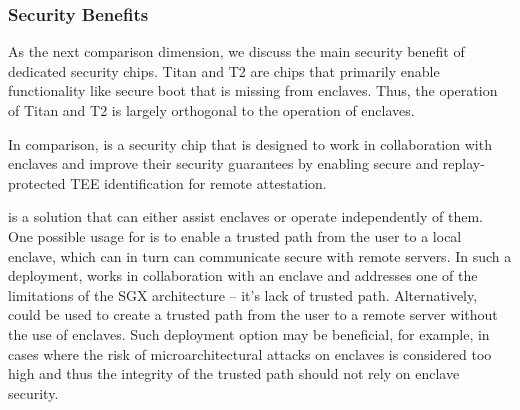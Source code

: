 \subsubsection*{Security Benefits}

As the next comparison dimension, we discuss the main security benefit of dedicated security chips. Titan and T2 are chips that primarily enable functionality like secure boot that is missing from enclaves. Thus, the operation of Titan and T2 is largely orthogonal to the operation of enclaves. 

In comparison, \proximitee is a security chip that is designed to work in collaboration with enclaves and improve their security guarantees by enabling secure and replay-protected TEE identification for remote attestation. 

\protection is a solution that can either assist enclaves or operate independently of them. One possible usage for \protection is to enable a trusted path from the user to a local enclave, which can in turn can communicate secure with remote servers. In such a deployment, \protection works in collaboration with an enclave and addresses one of the limitations of the SGX architecture -- it’s lack of trusted path. Alternatively, \protection could be used to create a trusted path from the user to a remote server without the use of enclaves. Such deployment option may be beneficial, for example, in cases where the risk of microarchitectural attacks on enclaves is considered too high and thus the integrity of the trusted path should not rely on enclave security.


